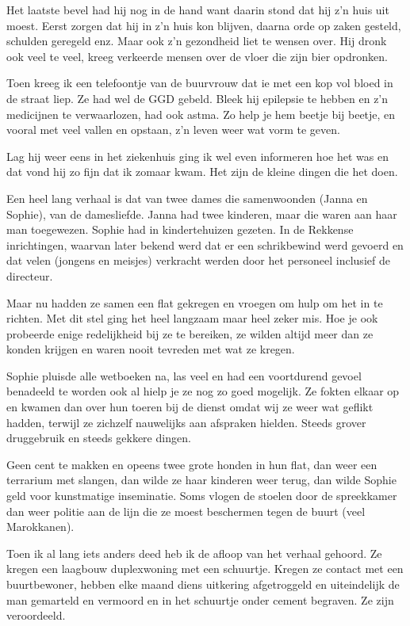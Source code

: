 \documentclass[10pt,twoside,openright]{memoir}
\begin{document}
Het laatste bevel had hij nog in de hand want daarin stond dat hij z’n huis uit moest. Eerst zorgen dat hij in z’n huis kon blijven, daarna orde op zaken gesteld, schulden geregeld enz. Maar ook z’n gezondheid liet te wensen over. Hij dronk ook veel te veel, kreeg verkeerde mensen over de vloer die zijn bier opdronken. 

Toen kreeg ik een telefoontje van de buurvrouw dat ie met een kop vol bloed in de straat liep. Ze had wel de GGD gebeld. Bleek hij epilepsie te hebben en z’n medicijnen te verwaarlozen, had ook astma. Zo help je hem beetje bij beetje, en vooral met veel vallen en opstaan, z’n leven weer wat vorm te geven. 

Lag hij weer eens in het ziekenhuis ging ik wel even informeren hoe het was en dat vond hij zo fijn dat ik zomaar kwam. Het zijn de kleine dingen die het doen.

Een heel lang verhaal is dat van twee dames die samenwoonden (Janna en Sophie), van de damesliefde. Janna had twee kinderen, maar die waren aan haar man toegewezen. Sophie had in kindertehuizen gezeten. In de Rekkense inrichtingen, waarvan later bekend werd dat er een schrikbewind werd gevoerd en dat velen (jongens en meisjes) verkracht werden door het personeel inclusief de directeur. 

Maar nu hadden ze samen een flat gekregen en vroegen om hulp om het in te richten. Met dit stel ging het heel langzaam maar heel zeker mis. Hoe je ook probeerde enige redelijkheid bij ze te bereiken, ze wilden altijd meer dan ze konden krijgen en waren nooit tevreden met wat ze kregen. 

Sophie pluisde alle wetboeken na, las veel en had een voortdurend gevoel benadeeld te worden ook al hielp je ze nog zo goed mogelijk. Ze fokten elkaar op en kwamen dan over hun toeren bij de dienst omdat wij ze weer wat geflikt hadden, terwijl ze zichzelf nauwelijks aan afspraken hielden. Steeds grover druggebruik en steeds gekkere dingen. 

Geen cent te makken en opeens twee grote honden in hun flat, dan weer een terrarium met slangen, dan wilde ze haar kinderen weer terug, dan wilde Sophie geld voor kunstmatige inseminatie. Soms vlogen de stoelen door de spreekkamer dan weer politie aan de lijn die ze moest beschermen tegen de buurt (veel Marokkanen). 

Toen ik al lang iets anders deed heb ik de afloop van het verhaal gehoord. Ze kregen een laagbouw duplexwoning met een schuurtje. Kregen ze contact met een buurtbewoner, hebben elke maand diens uitkering afgetroggeld en uiteindelijk de man gemarteld en vermoord en in het schuurtje onder cement begraven. Ze zijn veroordeeld. 
\end{document}
